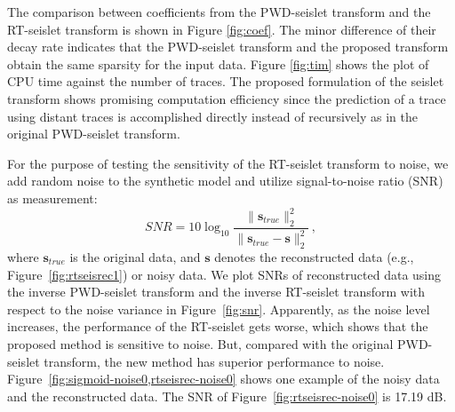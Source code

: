     The comparison between coefficients from the PWD-seislet transform and 
    the RT-seislet transform is shown in Figure \ref{fig:coef}. 
    The minor difference of their decay rate indicates that the PWD-seislet 
    transform and the proposed transform obtain the same sparsity for the input 
    data.
    Figure \ref{fig:tim} shows the plot of CPU time against the number of 
    traces. The proposed formulation of the seislet transform shows promising 
    computation efficiency since the prediction of a trace using distant 
    traces is accomplished directly instead of recursively as in the original 
    PWD-seislet transform.


    For the purpose of testing the sensitivity of the RT-seislet transform to 
    noise, we add random noise to the synthetic model and utilize 
    signal-to-noise ratio (SNR) as measurement: 
    \begin{equation}
        \label{snr}
        SNR=10\log_{10}\frac{\|\mathbf{s}_{true}\|^2_2}
        {\|\mathbf{s}_{true}-\mathbf{s}\|^2_2}\,,
    \end{equation}
    where $\mathbf{s}_{true}$ is the original data, and $\mathbf{s}$ denotes
    the reconstructed data (e.g., Figure~\ref{fig:rtseisrec1}) or noisy data.
    We plot SNRs of reconstructed data using the inverse PWD-seislet transform 
    and the inverse RT-seislet transform with respect to the noise variance in 
    Figure~\ref{fig:snr}. 
    Apparently, as the noise level increases, the performance of the RT-seislet 
    gets worse, which shows that the proposed method is sensitive to noise. 
    But, compared with the original PWD-seislet transform, the new method has 
    superior performance  to noise.
    Figure~\ref{fig:sigmoid-noise0,rtseisrec-noise0} shows one example of the
    noisy data and the reconstructed data. The SNR of 
    Figure~\ref{fig:rtseisrec-noise0} is 17.19 dB.


